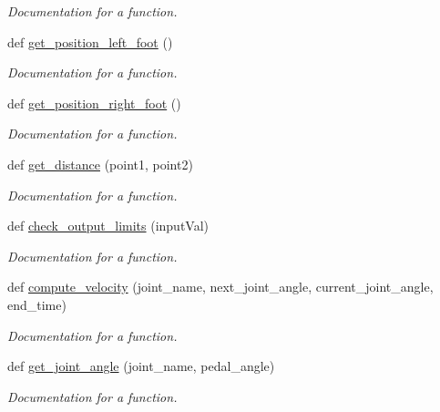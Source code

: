 \begin{DoxyCompactItemize}
\begin{DoxyCompactList}\small\item\em Documentation for a function. \end{DoxyCompactList}\item 
def \mbox{\hyperlink{namespacepedal__simulation_a8b04dab1a1e4cbd7c91e4d58308cac00}{get\+\_\+position\+\_\+left\+\_\+foot}} ()
\begin{DoxyCompactList}\small\item\em Documentation for a function. \end{DoxyCompactList}\item 
def \mbox{\hyperlink{namespacepedal__simulation_a559e9830e669d3a9b4ffa957dbe84194}{get\+\_\+position\+\_\+right\+\_\+foot}} ()
\begin{DoxyCompactList}\small\item\em Documentation for a function. \end{DoxyCompactList}\item 
def \mbox{\hyperlink{namespacepedal__simulation_adb861e8a115a0b376ef206e7efec9bd0}{get\+\_\+distance}} (point1, point2)
\begin{DoxyCompactList}\small\item\em Documentation for a function. \end{DoxyCompactList}\item 
def \mbox{\hyperlink{namespacepedal__simulation_a9a988ba4805ee8b66861de311be2f06d}{check\+\_\+output\+\_\+limits}} (input\+Val)
\begin{DoxyCompactList}\small\item\em Documentation for a function. \end{DoxyCompactList}\item 
def \mbox{\hyperlink{namespacepedal__simulation_addcf80200775d7c345ec27ef9995c838}{compute\+\_\+velocity}} (joint\+\_\+name, next\+\_\+joint\+\_\+angle, current\+\_\+joint\+\_\+angle, end\+\_\+time)
\begin{DoxyCompactList}\small\item\em Documentation for a function. \end{DoxyCompactList}\item 
def \mbox{\hyperlink{namespacepedal__simulation_a05ba3597b304090a3db746672dfe7d75}{get\+\_\+joint\+\_\+angle}} (joint\+\_\+name, pedal\+\_\+angle)
\begin{DoxyCompactList}\small\item\em Documentation for a function. \end{DoxyCompactList}\item 

\end{DoxyCompactItemize}
